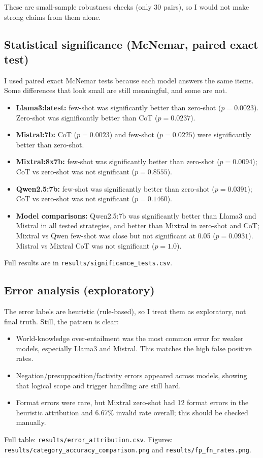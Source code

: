 \documentclass[11pt, a4paper]{article}
\begin{document}
These are small-sample robustness checks (only 30 pairs), so I would not make strong claims from them alone.

\subsection*{\color{bambergnavy} Statistical significance (McNemar, paired exact test)}
I used paired exact McNemar tests because each model answers the same items. Some differences that look small are still meaningful, and some are not.
\begin{itemize}[leftmargin=*]
    \item \textbf{Llama3:latest:} few-shot was significantly better than zero-shot ($p = 0.0023$). Zero-shot was significantly better than CoT ($p = 0.0237$).
    \item \textbf{Mistral:7b:} CoT ($p = 0.0023$) and few-shot ($p = 0.0225$) were significantly better than zero-shot.
    \item \textbf{Mixtral:8x7b:} few-shot was significantly better than zero-shot ($p = 0.0094$); CoT vs zero-shot was not significant ($p = 0.8555$).
    \item \textbf{Qwen2.5:7b:} few-shot was significantly better than zero-shot ($p = 0.0391$); CoT vs zero-shot was not significant ($p = 0.1460$).
    \item \textbf{Model comparisons:} Qwen2.5:7b was significantly better than Llama3 and Mistral in all tested strategies, and better than Mixtral in zero-shot and CoT; Mixtral vs Qwen few-shot was close but not significant at 0.05 ($p = 0.0931$). Mistral vs Mixtral CoT was not significant ($p = 1.0$).
\end{itemize}
Full results are in \texttt{results/significance\_tests.csv}.

\subsection*{\color{bambergnavy} Error analysis (exploratory)}
The error labels are heuristic (rule-based), so I treat them as exploratory, not final truth. Still, the pattern is clear:
\begin{itemize}[leftmargin=*]
    \item World-knowledge over-entailment was the most common error for weaker models, especially Llama3 and Mistral. This matches the high false positive rates.
    \item Negation/presupposition/factivity errors appeared across models, showing that logical scope and trigger handling are still hard.
    \item Format errors were rare, but Mixtral zero-shot had 12 format errors in the heuristic attribution and 6.67\% invalid rate overall; this should be checked manually.
\end{itemize}
Full table: \texttt{results/error\_attribution.csv}. Figures: \texttt{results/category\_accuracy\_comparison.png} and \texttt{results/fp\_fn\_rates.png}.
\end{document}
